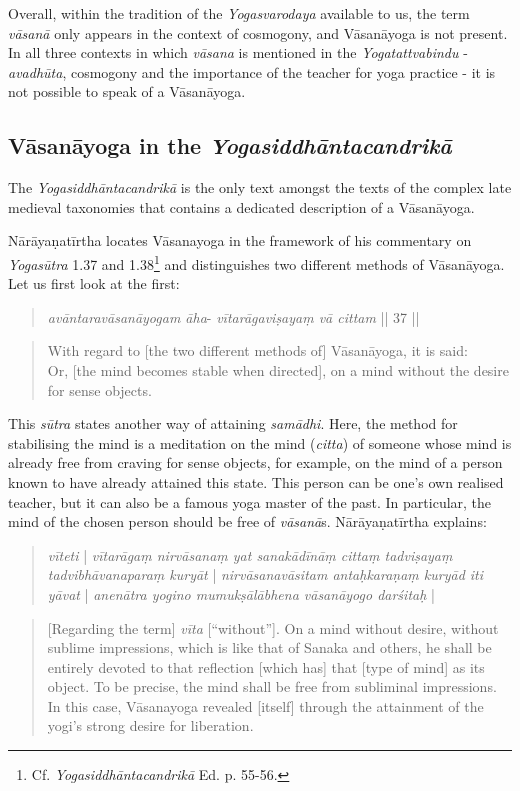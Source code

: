 Overall, within the tradition of the \textit{Yogasvarodaya} available to us, the term \textit{vāsanā} only appears in the context of cosmogony, and Vāsanāyoga is not present. In all three contexts in which \textit{vāsana} is mentioned in the \textit{Yogatattvabindu} - \textit{avadhūta}, cosmogony and the importance of the teacher for yoga practice - it is not possible to speak of a Vāsanāyoga.

\subsection{Vāsanāyoga in the \textit{Yogasiddhāntacandrikā}}
\label{laksyayogaintrocandrika}  

The \textit{Yogasiddhāntacandrikā} is the only text amongst the texts of the complex late medieval taxonomies that contains a dedicated description of a Vāsanāyoga.

Nārāyaṇatīrtha locates Vāsanayoga in the framework of his commentary on \textit{Yogasūtra} 1.37 and 1.38\footnote{Cf. \textit{Yogasiddhāntacandrikā} Ed. p. 55-56.} and distinguishes two different methods of Vāsanāyoga. Let us first look at the first:

\begin{quote}
\textit{avāntaravāsanāyogam āha}-
\textit{vītarāgaviṣayaṃ vā cittam} || 37 ||
\end{quote}
\begin{quote}
With regard to [the two different methods of] Vāsanāyoga, it is said: \\
Or, [the mind becomes stable when directed], on a mind without the desire for sense objects. 
\end{quote}

This \textit{sūtra} states another way of attaining \textit{samādhi}. Here, the method for stabilising the mind is a meditation on the mind (\textit{citta}) of someone whose mind is already free from craving for sense objects, for example, on the mind of a person known to have already attained this state. This person can be one's own realised teacher, but it can also be a famous yoga master of the past. In particular, the mind of the chosen person should be free of \textit{vāsanā}s. Nārāyaṇatīrtha explains:

\begin{quote}
  \textit{vīteti} | \textit{vītarāgaṃ nirvāsanaṃ yat sanakādīnāṃ cittaṃ tadviṣayaṃ tadvibhāvanaparaṃ kuryāt} | \textit{nirvāsanavāsitam antaḥkaraṇaṃ kuryād iti yāvat} | \textit{anenātra yogino mumukṣālābhena vāsanāyogo darśitaḥ} |
\end{quote}
\begin{quote}
[Regarding the term] \textit{vīta} [``without'']. On a mind without desire, without sublime impressions, which is like that of Sanaka and others, he shall be entirely devoted to that reflection [which has] that [type of mind] as its object. To be precise, the mind shall be free from subliminal impressions. In this case, Vāsanayoga revealed [itself] through the attainment of the yogi's strong desire for liberation. 
\end{quote}

